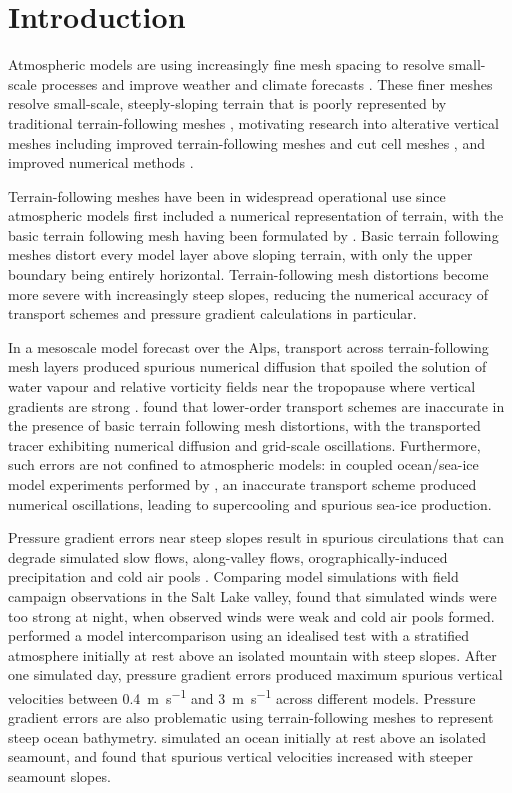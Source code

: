 \chapter{Introduction}

Atmospheric models are using increasingly fine mesh spacing to resolve small-scale processes and improve weather and climate forecasts \citep{wedi2014}.
These finer meshes resolve small-scale, steeply-sloping terrain that is poorly represented by traditional terrain-following meshes \citep{schaer2002}, motivating research into alterative vertical meshes including improved terrain-following meshes \citep{schaer2002,klemp2011} and cut cell meshes \citep{jaehn2015,yamazaki2016}, and improved numerical methods \citep{zaengl2012,steppeler-klemp2017}.

Terrain-following meshes have been in widespread operational use since atmospheric models first included a numerical representation of terrain, with the basic terrain following mesh having been formulated by \citet{galchen-somerville1975a}.
Basic terrain following meshes distort every model layer above sloping terrain, with only the upper boundary being entirely horizontal.
Terrain-following mesh distortions become more severe with increasingly steep slopes, reducing the numerical accuracy of transport schemes and pressure gradient calculations in particular.

In a mesoscale model forecast over the Alps, transport across terrain-following mesh layers produced spurious numerical diffusion that spoiled the solution of water vapour and relative vorticity fields near the tropopause where vertical gradients are strong \citep{hoinka-zaengl2004}.
\citet{schaer2002} found that lower-order transport schemes are inaccurate in the presence of basic terrain following mesh distortions, with the transported tracer exhibiting numerical diffusion and grid-scale oscillations.
Furthermore, such errors are not confined to atmospheric models: in coupled ocean/sea-ice model experiments performed by \citet{naughten2017}, an inaccurate transport scheme produced numerical oscillations, leading to supercooling and spurious sea-ice production.

Pressure gradient errors near steep slopes result in spurious circulations that can degrade simulated slow flows, along-valley flows, orographically-induced precipitation and cold air pools \citep{zaengl2004a}.
Comparing model simulations with field campaign observations in the Salt Lake valley, \citet{fast2003} found that simulated winds were too strong at night, when observed winds were weak and cold air pools formed.
\citet{zaengl2004a} performed a model intercomparison using an idealised test with a stratified atmosphere initially at rest above an isolated mountain with steep slopes.
After one simulated day, pressure gradient errors produced maximum spurious vertical velocities between \SI{0.4}{\meter\per\second} and \SI{3}{\meter\per\second} across different models.
Pressure gradient errors are also problematic using terrain-following meshes to represent steep ocean bathymetry.  
\citet{luo2002} simulated an ocean initially at rest above an isolated seamount, and found that spurious vertical velocities increased with steeper seamount slopes.

